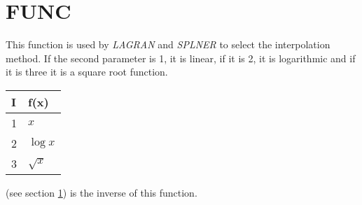 \section{FUNC}
\label{sect:func}

\noindent This function is used by {\em LAGRAN} and {\em SPLNER} to select
the interpolation method. If the second parameter is 1, it is linear, if it
is 2, it is logarithmic and if it is three it is a square root function.

\begin{center}
\begin{tabular}{|ll|}
\hline
I & f(x)\\
\hline
1 & $x$\\
2 & $\log{x}$\\
3 & $\sqrt{x}$\\
\hline
\end{tabular}
\end{center}

 (see section \ref{sect:func}) is the inverse of this
function.\\
